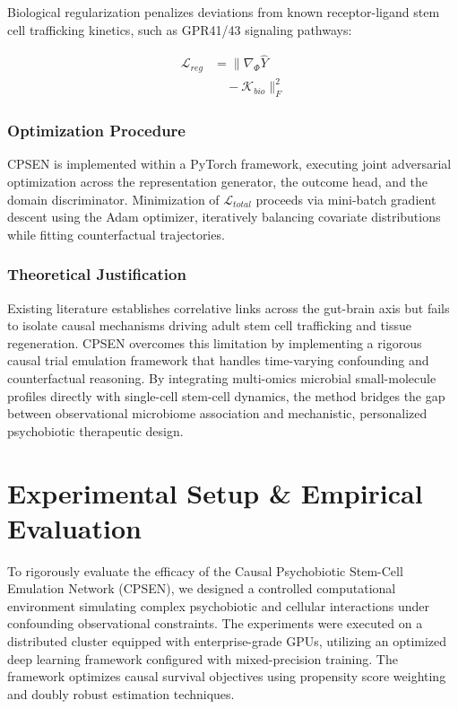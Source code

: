 \documentclass[10pt,twocolumn]{article}
\begin{document}
Biological regularization 
penalizes deviations from 
known receptor-ligand stem 
cell trafficking kinetics, 
such as GPR41/43 signaling 
pathways:

\begin{equation}
\begin{aligned}
\mathcal{L}_{reg} &= \| 
\nabla_{\Phi} \hat{Y} \\
&\quad - \mathcal{K}_{bio} 
\|_F^2
\end{aligned}
\end{equation}

\subsubsection{Optimization Procedure}
CPSEN is implemented within 
a PyTorch framework, executing 
joint adversarial optimization 
across the representation 
generator, the outcome head, 
and the domain discriminator. 
Minimization of $\mathcal{L}_{total}$ 
proceeds via mini-batch 
gradient descent using the 
Adam optimizer, iteratively 
balancing covariate distributions 
while fitting counterfactual 
trajectories.

\subsubsection{Theoretical Justification}
Existing literature establishes 
correlative links across 
the gut-brain axis but fails 
to isolate causal mechanisms 
driving adult stem cell 
trafficking and tissue 
regeneration. CPSEN overcomes 
this limitation by implementing 
a rigorous causal trial 
emulation framework that handles 
time-varying confounding and 
counterfactual reasoning. 
By integrating multi-omics 
microbial small-molecule 
profiles directly with 
single-cell stem-cell 
dynamics, the method bridges 
the gap between observational 
microbiome association and 
mechanistic, personalized 
psychobiotic therapeutic design.

\section{Experimental Setup \& Empirical Evaluation}
To rigorously evaluate the efficacy of the Causal Psychobiotic Stem-Cell Emulation Network (CPSEN), we designed a controlled computational environment simulating complex psychobiotic and cellular interactions under confounding observational constraints. The experiments were executed on a distributed cluster equipped with enterprise-grade GPUs, utilizing an optimized deep learning framework configured with mixed-precision training. The framework optimizes causal survival objectives using propensity score weighting and doubly robust estimation techniques. 
\end{document}
